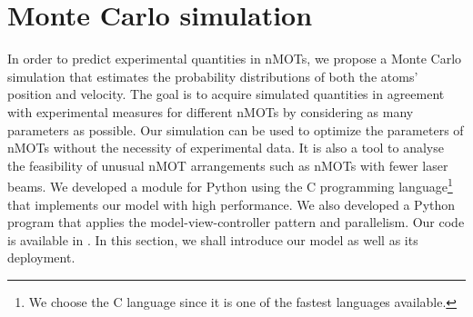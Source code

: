 %
\chapter{Monte Carlo simulation}
\label{ch:Monte-Carlo-simulation}
%

In order to predict experimental quantities in nMOTs, we propose a Monte Carlo simulation that estimates the probability distributions of both the atoms' position and velocity. The goal is to acquire simulated quantities in agreement with experimental measures for different nMOTs by considering as many parameters as possible. Our simulation can be used to optimize the parameters of nMOTs without the necessity of experimental data. It is also a tool to analyse the feasibility of unusual nMOT arrangements such as nMOTs with fewer laser beams. We developed a module for Python using the C programming language\footnote{We choose the C language since it is one of the fastest languages available.} that implements our model with high performance. We also developed a Python program that applies the model-view-controller pattern and parallelism. Our code is available in \cite{nMOT_sim}. In this section, we shall introduce our model as well as its deployment.


%


%
